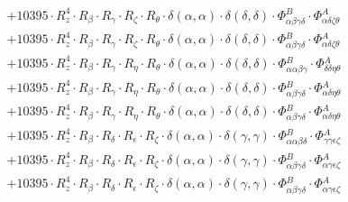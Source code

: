 \documentclass{article}
\begin{document}
\begin{subequations}
\begin{gather}
\begin{array}{c}
 \\[0.2em] 		 + 10395 \cdot R_{z}^{4} \cdot R_{\beta{}} \cdot R_{\gamma{}} \cdot R_{\zeta{}} \cdot R_{\theta{}} \cdot \delta{}\left(\alpha{}, \alpha{}\right) \cdot \delta{}\left(\delta{}, \delta{}\right) \cdot \Phi{}^{B}_{\alpha{}\beta{}\gamma{}\delta{}} \cdot \Phi{}^{A}_{\alpha{}\delta{}\zeta{}\theta{}} 
 \\[0.2em] 		 + 10395 \cdot R_{z}^{4} \cdot R_{\beta{}} \cdot R_{\gamma{}} \cdot R_{\zeta{}} \cdot R_{\theta{}} \cdot \delta{}\left(\alpha{}, \alpha{}\right) \cdot \delta{}\left(\delta{}, \delta{}\right) \cdot \Phi{}^{B}_{\alpha{}\beta{}\gamma{}\delta{}} \cdot \Phi{}^{A}_{\alpha{}\delta{}\zeta{}\theta{}} 
 \\[0.2em] 		 + 10395 \cdot R_{z}^{4} \cdot R_{\beta{}} \cdot R_{\gamma{}} \cdot R_{\eta{}} \cdot R_{\theta{}} \cdot \delta{}\left(\alpha{}, \alpha{}\right) \cdot \delta{}\left(\delta{}, \delta{}\right) \cdot \Phi{}^{B}_{\alpha{}\alpha{}\beta{}\gamma{}} \cdot \Phi{}^{A}_{\delta{}\delta{}\eta{}\theta{}} 
 \\[0.2em] 		 + 10395 \cdot R_{z}^{4} \cdot R_{\beta{}} \cdot R_{\gamma{}} \cdot R_{\eta{}} \cdot R_{\theta{}} \cdot \delta{}\left(\alpha{}, \alpha{}\right) \cdot \delta{}\left(\delta{}, \delta{}\right) \cdot \Phi{}^{B}_{\alpha{}\beta{}\gamma{}\delta{}} \cdot \Phi{}^{A}_{\alpha{}\delta{}\eta{}\theta{}} 
 \\[0.2em] 		 + 10395 \cdot R_{z}^{4} \cdot R_{\beta{}} \cdot R_{\gamma{}} \cdot R_{\eta{}} \cdot R_{\theta{}} \cdot \delta{}\left(\alpha{}, \alpha{}\right) \cdot \delta{}\left(\delta{}, \delta{}\right) \cdot \Phi{}^{B}_{\alpha{}\beta{}\gamma{}\delta{}} \cdot \Phi{}^{A}_{\alpha{}\delta{}\eta{}\theta{}} 
 \\[0.2em] 		 + 10395 \cdot R_{z}^{4} \cdot R_{\beta{}} \cdot R_{\delta{}} \cdot R_{\epsilon{}} \cdot R_{\zeta{}} \cdot \delta{}\left(\alpha{}, \alpha{}\right) \cdot \delta{}\left(\gamma{}, \gamma{}\right) \cdot \Phi{}^{B}_{\alpha{}\alpha{}\beta{}\delta{}} \cdot \Phi{}^{A}_{\gamma{}\gamma{}\epsilon{}\zeta{}} 
 \\[0.2em] 		 + 10395 \cdot R_{z}^{4} \cdot R_{\beta{}} \cdot R_{\delta{}} \cdot R_{\epsilon{}} \cdot R_{\zeta{}} \cdot \delta{}\left(\alpha{}, \alpha{}\right) \cdot \delta{}\left(\gamma{}, \gamma{}\right) \cdot \Phi{}^{B}_{\alpha{}\beta{}\gamma{}\delta{}} \cdot \Phi{}^{A}_{\alpha{}\gamma{}\epsilon{}\zeta{}} 
 \\[0.2em] 		 + 10395 \cdot R_{z}^{4} \cdot R_{\beta{}} \cdot R_{\delta{}} \cdot R_{\epsilon{}} \cdot R_{\zeta{}} \cdot \delta{}\left(\alpha{}, \alpha{}\right) \cdot \delta{}\left(\gamma{}, \gamma{}\right) \cdot \Phi{}^{B}_{\alpha{}\beta{}\gamma{}\delta{}} \cdot \Phi{}^{A}_{\alpha{}\gamma{}\epsilon{}\zeta{}} 

\end{array}
\end{gather}
\end{subequations}
\end{document}
